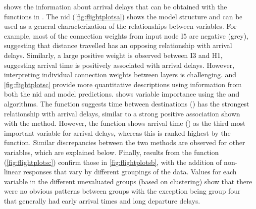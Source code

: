 \documentclass[article,shortnames]{jss}
\begin{document}
 shows the information about arrival delays that can be obtained with the functions in . The \ac{nid} (\ref{fig:flightplotsa}) shows the model structure and can be used as a general characterization of the relationships between variables.  For example, most of the connection weights from input node I5 are negative (grey), suggesting that distance travelled has an opposing relationship with arrival delays. Similarly, a large positive weight is observed between I3 and H1, suggesting arrival time is positively associated with arrival delays.  However, interpreting individual connection weights between layers is challenging.   and \ref{fig:flightplotsc} provide more quantitative descriptions using information from both the \ac{nid} and model predictions.   shows variable importance using the  and  algorithms.  The  function suggests time between destinations () has the strongest relationship with arrival delays, similar to a strong positive association shown with the  method. However, the  function shows arrival time () as the third most important variable for arrival delays, whereas this is ranked highest by the  function. Similar discrepancies between the two methods are observed for other variables, which are explained below. Finally, results from the  function (\ref{fig:flightplotsc}) confirm those in \ref{fig:flightplotsb}, with the addition of non-linear responses that vary by different groupings of the data.  Values for each variable in the different unevaluated groups (based on clustering) show that there were no obvious patterns between groups with the exception being group four that generally had early arrival times and long departure delays.    
\end{document}
